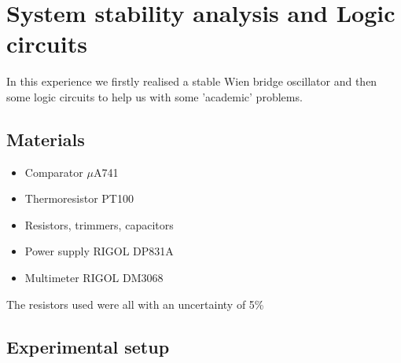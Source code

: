 \chapter{System stability analysis and Logic circuits}
In this experience we firstly realised a stable Wien bridge oscillator and then some logic circuits to help us with some 'academic' problems.

\section{Materials}
\begin{itemize}
\item Comparator $\mu$A741
\item Thermoresistor PT100
\item Resistors, trimmers, capacitors
\item Power supply RIGOL DP831A
\item Multimeter RIGOL DM3068
\end{itemize}
The resistors used were all with an uncertainty of 5\%

\section{Experimental setup}

